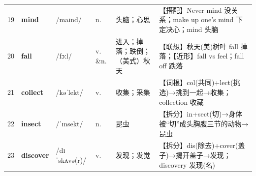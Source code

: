 \documentclass[UTF8,a4paper,11pt,oneside]{ctexbook}
\newcommand{\cellword}[1]{{\bfseries\textcolor{wordcol}{#1}}}
\newcommand{\cellipa}[1]{{\footnotesize\textcolor{ipacol}{#1}}}
\newcommand{\cellpos}[1]{\textcolor{poscol}{#1}}
\newcommand{\cellno}[1]{\textcolor{volcolor!75!black}{#1}}
\begin{document}
{\begin{longtable}{@{}C{0.045\textwidth}L{0.155\textwidth}L{0.175\textwidth}C{0.070\textwidth}L{0.180\textwidth}L{0.282\textwidth}@{}}
 \cellno{19} & \cellword{mind} & \cellipa{/maɪnd/} & \cellpos{n.} & 头脑；心思 & \textcolor{tagColloc}{【搭配】}Never mind 没关系；make up one's mind 下定决心；mind 头脑 \\
\cellno{20} & \cellword{fall} & \cellipa{/fɔːl/} & \cellpos{v. \&n.} & 进入；掉落；跌倒；（美式）秋天 & \textcolor{tagAssoc}{【联想】}秋天(美)树叶 fall 掉落；\textcolor{tagNear}{【近形】}fall vs feel；fall off 跌落 \\
 \cellno{21} & \cellword{collect} & \cellipa{/kəˈlekt/} & \cellpos{v.} & 收集；采集 & \textcolor{tagRoot}{【词根】}col(共同)+lect(挑选)→\allowbreak{}挑到一起→\allowbreak{}收集；collection 收藏 \\
\cellno{22} & \cellword{insect} & \cellipa{/ˈɪnsekt/} & \cellpos{n.} & 昆虫 & \textcolor{tagSplit}{【拆分】}in+sect(切)→\allowbreak{}身体被“切”成头胸腹三节的动物→\allowbreak{}昆虫 \\
 \cellno{23} & \cellword{discover} & \cellipa{/dɪˈskʌvə(r)/} & \cellpos{v.} & 发现；发觉 & \textcolor{tagSplit}{【拆分】}dis(除去)+cover(盖子)→\allowbreak{}揭开盖子→\allowbreak{}发现；discovery 发现(名) \\
\end{longtable}
}

\end{document}
